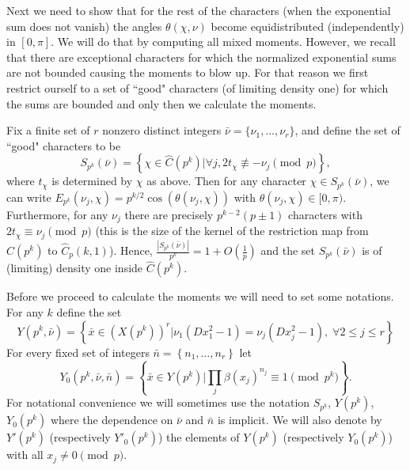 \documentclass[12pt]{amsart}
\theoremstyle{definition}
\theoremstyle{remark}
\numberwithin{equation}{section}
\newcommand{\set}[1]{\left\{#1\right\}}
\begin{document}
Next we need to show that for the rest of the characters (when the
exponential sum does not vanish) the angles  $\theta(\chi,\nu)$
become equidistributed (independently) in $[0,\pi]$. We will do that
by computing all mixed moments. However, we recall that there are
exceptional characters for which the normalized exponential sums are
not bounded causing the moments to blow up. For that reason we first
restrict ourself to a set of ``good" characters (of limiting density
one) for which the sums are bounded and only then we calculate the
moments.

Fix a finite set of $r$ nonzero distinct integers
$\bar\nu=\{\nu_1,\ldots,\nu_r\}$, and define the set of ``good"
characters to be
\[S_{p^k}(\bar\nu)=\set{\chi\in\hat C(p^k)|\forall j, 2t_\chi \not\equiv -\nu_j\pmod{p}},\]
where $t_\chi$ is determined by $\chi$ as above. Then for any
character $\chi\in S_{p^k}(\bar\nu)$, we can write
$E_{p^k}(\nu_j,\chi)=p^{k/2}\cos(\theta(\nu_j,\chi))$ with
$\theta(\nu_j,\chi)\in[0,\pi)$. Furthermore, for any  $\nu_j$ there
are precisely $p^{k-2}(p\pm 1)$ characters with
$2t_\chi\equiv\nu_j\pmod{p}$ (this is the size of the kernel of the
restriction map from $\hat C(p^k)$ to $\hat C_p(k,1)$). Hence,
$\frac{|S_{p^k}(\bar\nu)|}{p^k}=1+O(\frac{1}{p})$ and the set
$S_{p^k}(\bar\nu)$ is of (limiting) density one inside $\hat
C(p^k)$.

Before we proceed to calculate the moments we will need to set some
notations. For any $k$ define the set
\[Y(p^k,\bar \nu)=\set{\bar{x}\in (X(p^k))^r|\nu_1(Dx_1^2-1)=\nu_j(Dx_j^2-1),\;\forall 2\leq j\leq r}\]
For every fixed set of integers $\bar n=\set{n_1,\ldots,n_r}$ let
\[Y_0(p^k,\bar\nu,\bar n)=\set{\bar{x}\in Y(p^k)|\prod_j \beta(x_j)^{n_j}\equiv 1\pmod{p^k}}.\]
For notational convenience we will sometimes use the notation
$S_{p^k}$, 
$Y(p^k)$, $Y_0(p^k)$ where the dependence on $\bar\nu$ and
$\bar n$ is implicit. We will also denote by $Y'(p^k)$ (respectively
$Y'_0(p^k)$) the elements of $Y(p^k)$ (respectively $Y_0(p^k)$) with
all $x_j\neq 0\pmod{p}$.
\end{document}
